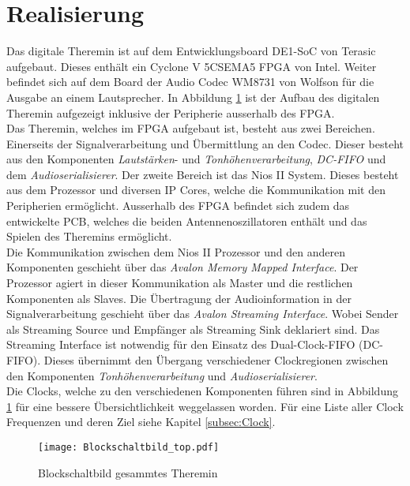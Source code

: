

\clearpage
\section{Realisierung}\label{sec:Realisierung}

Das digitale Theremin ist auf dem Entwicklungsboard DE1-SoC von Terasic aufgebaut. Dieses enthält ein Cyclone V 5CSEMA5 FPGA von Intel. Weiter befindet sich auf dem Board der Audio Codec WM8731 von Wolfson für die Ausgabe an einem Lautsprecher. In Abbildung \ref{img:Blockschaltbild_top} ist der Aufbau des digitalen Theremin aufgezeigt inklusive der Peripherie ausserhalb des FPGA.\\
Das Theremin, welches im FPGA aufgebaut ist, besteht aus zwei Bereichen. Einerseits der Signalverarbeitung und Übermittlung an den Codec. Dieser besteht aus den Komponenten \textit{Lautstärken}- und \textit{Tonhöhenverarbeitung}, \textit{DC-FIFO} und dem \textit{Audioserialisierer}. Der zweite Bereich ist das Nios II System. Dieses besteht aus dem Prozessor und diversen IP Cores, welche die Kommunikation mit den Peripherien ermöglicht. Ausserhalb des FPGA befindet sich zudem das entwickelte PCB, welches die beiden Antennenoszillatoren enthält und das Spielen des Theremins ermöglicht.\\
Die Kommunikation zwischen dem Nios II Prozessor und den anderen Komponenten geschieht über das \textit{Avalon Memory Mapped Interface}. Der Prozessor agiert in dieser Kommunikation als Master und die restlichen Komponenten als Slaves. Die Übertragung der Audioinformation in der Signalverarbeitung geschieht über das \textit{Avalon Streaming Interface}. Wobei Sender als Streaming Source und Empfänger als Streaming Sink deklariert sind. Das Streaming Interface ist notwendig für den Einsatz des Dual-Clock-FIFO (DC-FIFO). Dieses übernimmt den Übergang verschiedener Clockregionen zwischen den Komponenten \textit{Tonhöhenverarbeitung} und \textit{Audioserialisierer}.\\
Die Clocks, welche zu den verschiedenen Komponenten führen sind in Abbildung \ref{img:Blockschaltbild_top} für eine bessere Übersichtlichkeit weggelassen worden. Für eine Liste aller Clock Frequenzen und deren Ziel siehe Kapitel \ref{subsec:Clock}.

\begin{figure}[h!]
	\centering
	\texttt{[image: Blockschaltbild\_top.pdf]}
	\caption{Blockschaltbild gesammtes Theremin} 
	\label{img:Blockschaltbild_top}
\end{figure}  

\clearpage

